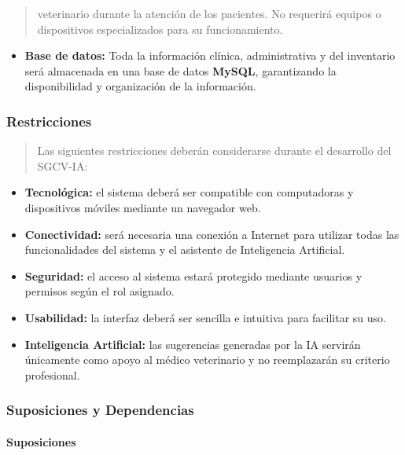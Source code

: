 \documentclass[
]{article}
\begin{document}
\begin{quote}
veterinario durante la atención de los pacientes. No requerirá equipos o
dispositivos especializados para su funcionamiento.
\end{quote}

\begin{itemize}
\item
  \textbf{Base de datos:} Toda la información clínica, administrativa y
  del inventario será almacenada en una base de datos \textbf{MySQL},
  garantizando la disponibilidad y organización de la información.
\end{itemize}

\subsubsection{Restricciones}\label{restricciones}

\begin{quote}
Las siguientes restricciones deberán considerarse durante el desarrollo
del SGCV-IA:
\end{quote}

\begin{itemize}
\item
  \textbf{Tecnológica:} el sistema deberá ser compatible con
  computadoras y dispositivos móviles mediante un navegador web.
\item
  \textbf{Conectividad:} será necesaria una conexión a Internet para
  utilizar todas las funcionalidades del sistema y el asistente de
  Inteligencia Artificial.
\item
  \textbf{Seguridad:} el acceso al sistema estará protegido mediante
  usuarios y permisos según el rol asignado.
\item
  \textbf{Usabilidad:} la interfaz deberá ser sencilla e intuitiva para
  facilitar su uso.
\item
  \textbf{Inteligencia Artificial:} las sugerencias generadas por la IA
  servirán únicamente como apoyo al médico veterinario y no reemplazarán
  su criterio profesional.
\end{itemize}

\subsubsection{Suposiciones y
Dependencias}\label{suposiciones-y-dependencias}

\paragraph{Suposiciones}\label{suposiciones}
\end{document}

